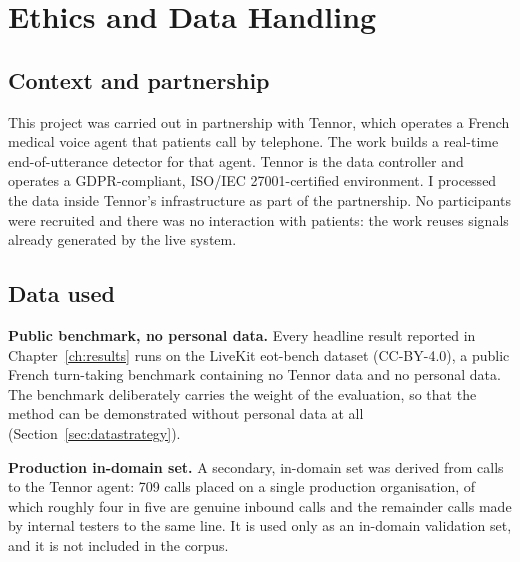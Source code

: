 \chapter{Ethics and Data Handling}
\label{app:ethics}

\section{Context and partnership}

This project was carried out in partnership with Tennor, which operates a French medical
voice agent that patients call by telephone. The work builds a real-time end-of-utterance
detector for that agent. Tennor is the data controller and operates a GDPR-compliant,
ISO/IEC 27001-certified environment. I processed the data inside Tennor's infrastructure as
part of the partnership. No participants were recruited and there was no interaction with
patients: the work reuses signals already generated by the live system.

\medskip
\noindent{}

\section{Data used}

\textbf{Public benchmark, no personal data.} Every headline result reported in
Chapter~\ref{ch:results} runs on the LiveKit eot-bench dataset (CC-BY-4.0), a public French
turn-taking benchmark containing no Tennor data and no personal data. The benchmark
deliberately carries the weight of the evaluation, so that the method can be demonstrated
without personal data at all (Section~\ref{sec:datastrategy}).

\textbf{Production in-domain set.} A secondary, in-domain set was derived from calls to the
Tennor agent: 709 calls placed on a single production organisation, of which roughly four in five
are genuine inbound calls and the remainder calls made by internal testers to the same line.
It is used only as an in-domain validation set, and it is not included in the corpus.

